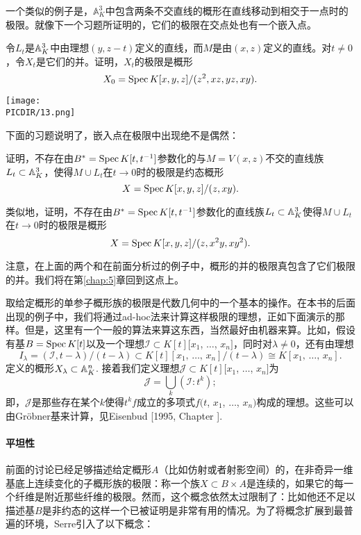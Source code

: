 一个类似的例子是，$\mathbb{A}_K^3$中包含两条不交直线的概形在直线移动到相交于一点时的极限。就像下一个习题所证明的，它们的极限在交点处也有一个嵌入点。

\begin{exe}
令$L_t$是$\mathbb{A}_K^3$中由理想$(y,z-t)$定义的直线，而$M$是由$(x,z)$定义的直线。对$t\neq 0$，令$X_t$是它们的并。证明，$X_t$的极限是概形
\[
	X_0=\operatorname{Spec} K[x,y,z]/(z^2,xz,yz,xy).
\]

\begin{center}\texttt{[image: \\PICDIR/13.png]}\end{center}
\end{exe}

下面的习题说明了，嵌入点在极限中出现绝不是偶然：

\begin{exe}
\begin{compactenum}[(a)]
\item 证明，不存在由$B^*=\operatorname{Spec} K[t,t^{-1}]$参数化的与$M=V(x,z)$不交的直线族$L_t\subset \mathbb{A}_K^3$，使得$M\cup L_t$在$t\to 0$时的极限是约态概形
\[
	X=\operatorname{Spec} K[x,y,z]/(z,xy).
\]

\item 类似地，证明，不存在由$B^*=\operatorname{Spec} K[t,t^{-1}]$参数化的直线族$L_t\subset \mathbb{A}_K^3$使得$M\cup L_t$在$t\to 0$时的极限是概形
\[
	X=\operatorname{Spec} K[x,y,z]/(z,x^2y,xy^2).
\]
\end{compactenum}

注意，在上面的两个和在前面分析过的例子中，概形的并的极限真包含了它们极限的并。我们将在第\ref{chap:5}章回到这点上。
\end{exe}

取给定概形的单参子概形族的极限是代数几何中的一个基本的操作。在本书的后面出现的例子中，我们将通过ad-hoc\nottran 法来计算这样极限的理想，正如下面演示的那样。但是，这里有一个一般的算法来算这东西，当然最好由机器来算。比如，假设有基$B=\operatorname{Spec} K[t]$以及一个理想$\mathscr{I}\subset K[t][x_1$, $\dots$, $x_n]$，同时对$\lambda \neq 0$，还有由理想
\[
	I_\lambda=(\mathscr{I},t-\lambda)/(t-\lambda)\subset K[t][\text{$x_1$, $\dots$, $x_n$}]/(t-\lambda)\cong K[\text{$x_1$, $\dots$, $x_n$}].
\]
定义的概形$X_\lambda\subset \mathbb{A}_K^n$. 接着我们定义理想$\mathscr{J}\subset K[t][x_1$, $\dots$, $x_n]$为
\[
	\mathscr{J}=\bigcup_k (\mathscr{I}:t^k);
\]
即，$\mathscr{J}$是那些存在某个$k$使得$t^k f$成立的多项式$f(t$, $x_1$, $\dots$, $x_n)$构成的理想。这些可以由Gr\"{o}bner基来计算，见Eisenbud [1995, Chapter \uppercase\expandafter{}].

\paragraph*{平坦性}
前面的讨论已经足够描述给定概形$A$（比如仿射或者射影空间）的，在非奇异一维基底上连续变化的子概形族的极限：称一个族$X\subset B\times A$是连续的，如果它的每一个纤维是附近那些纤维的极限。然而，这个概念依然太过限制了：比如他还不足以描述基$B$是非约态的这样一个已被证明是非常有用的情况。为了将概念扩展到最普遍的环境，Serre引入了以下概念：

